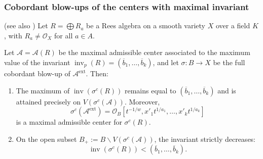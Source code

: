 \documentclass{amsart}
\newcommand{\ext}{{\operatorname{ext}}}
\renewcommand{\setminus}{\smallsetminus}
\newcommand{\inv}{{\operatorname{inv}}}
\begin{document}
\subsubsection{Cobordant blow-ups of the centers with maximal invariant}

\begin{proposition}\label{lower}
(see also \cite{ATW-weighted})  
Let $R = \bigoplus R_a$ be a Rees algebra on a smooth variety $X$ over a field $K$, with $R_a \neq \mathcal{O}_X$ for all $a \in A$. 

Let $\mathcal{A} = \mathcal{A}(R)$ be the maximal admissible center associated to the maximum value of the invariant $\inv_p(R) = (\overline{b}_1, \ldots, \overline{b}_k)$, and let $\sigma: B \to X$ be the full cobordant blow-up of $\mathcal{A}^{\ext}$. Then:

\begin{enumerate}
    \item The maximum of $\inv(\sigma^c(R))$ remains equal to $(\overline{b}_1, \ldots, \overline{b}_k)$ and is attained precisely on $V(\sigma^c(\mathcal{A}))$. Moreover,
    \[
    \sigma^c(\mathcal{A}^{\ext}) = \mathcal{O}_B[t^{-1/w}, x'_1 t^{1/a_1}, \ldots, x'_k t^{1/a_k}]
    \]
    is a maximal admissible center for $\sigma^c(R)$.

    \item On the open subset $B_+ := B \setminus V(\sigma^c(\mathcal{A}))$, the invariant strictly decreases:
    \[
    \inv(\sigma^c(R)) < (\overline{b}_1, \ldots, \overline{b}_k).
    \]
\end{enumerate}
\end{proposition}
\end{document}
